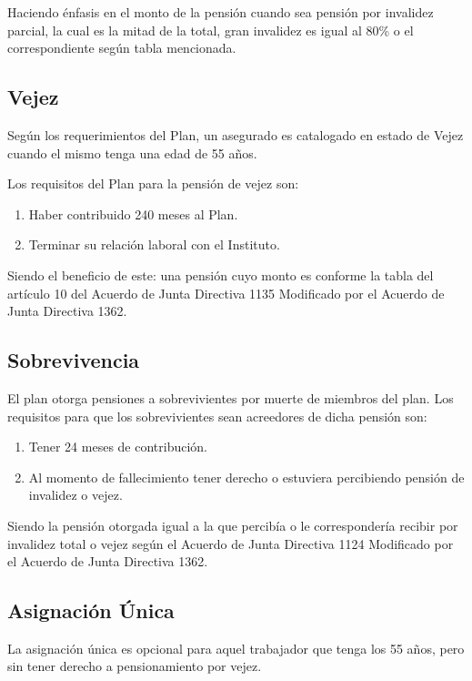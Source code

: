 \documentclass[12pt,letterpaper,titlepage]{article}
\begin{document}
Haciendo énfasis en el monto de la pensión cuando sea pensión por invalidez parcial, la cual es la mitad de la total, gran invalidez es igual al 80\% o el correspondiente según tabla mencionada.

\subsection{Vejez}

Según los requerimientos del Plan, un asegurado es catalogado en estado de Vejez cuando el mismo tenga una edad de 55 años.

Los requisitos del Plan para la pensión de vejez son:
\begin{enumerate}
	\item Haber contribuido 240 meses al Plan.
	\item Terminar su relación laboral con el Instituto.
\end{enumerate}

Siendo el beneficio de este: una pensión cuyo monto es conforme la tabla del artículo 10 del Acuerdo de Junta Directiva 1135 Modificado por el Acuerdo de Junta Directiva 1362.

\subsection{Sobrevivencia}

El plan otorga pensiones a sobrevivientes por muerte de miembros del plan. Los requisitos para que los sobrevivientes sean acreedores de dicha pensión son:

\begin{enumerate}
	\item Tener 24 meses de contribución.
	\item Al momento de fallecimiento tener derecho o estuviera percibiendo pensión de invalidez o vejez.
\end{enumerate}

Siendo la pensión otorgada igual a la que percibía o le correspondería recibir por invalidez total o vejez según el Acuerdo de Junta Directiva 1124 Modificado por el Acuerdo de Junta Directiva 1362.

\subsection{Asignación Única}

La asignación única es opcional para aquel trabajador que tenga los 55 años, pero sin tener derecho a pensionamiento por vejez. 
\end{document}
